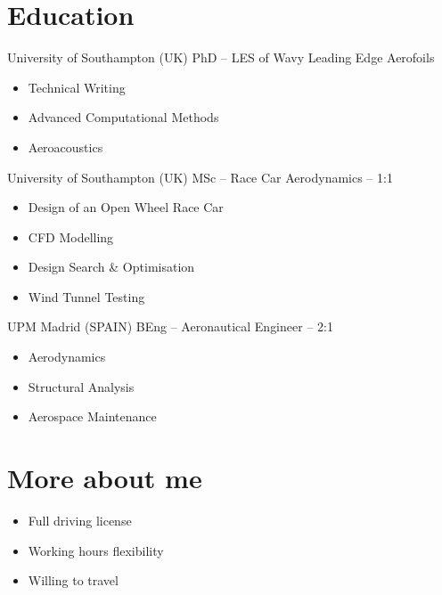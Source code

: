 \documentclass[fontsize=10pt]{tccv}
\begin{document}
\section{Education}
\begin{eventlist}
     	{University of Southampton (UK)}
     	{PhD -- \normalsize{LES of Wavy Leading Edge Aerofoils}} 
	\begin{itemize}
	\itemsep -2pt
		\item Technical Writing
		\item Advanced Computational Methods
		\item Aeroacoustics
	\end{itemize}

     	{University of Southampton (UK)}
     	{MSc -- Race Car Aerodynamics -- 1:1} 
  	\begin{itemize}
	\itemsep -2pt
	   \item Design of an Open Wheel Race Car
	   \item CFD Modelling
	   \item Design Search \& Optimisation
	   \item Wind Tunnel Testing
	\end{itemize}

	{UPM Madrid (SPAIN)}
	{BEng -- Aeronautical Engineer -- 2:1}
  	\begin{itemize}
	\itemsep -2pt
	   \item Aerodynamics
	   \item Structural Analysis
	   \item Aerospace Maintenance
	\end{itemize}
\end{eventlist}

\vspace{-20pt}
\section{More about me} 
\begin{itemize}
	\itemsep -2pt
	\item Full driving license
	\item Working hours flexibility
	\item Willing to travel
\end{itemize}
\end{document}
